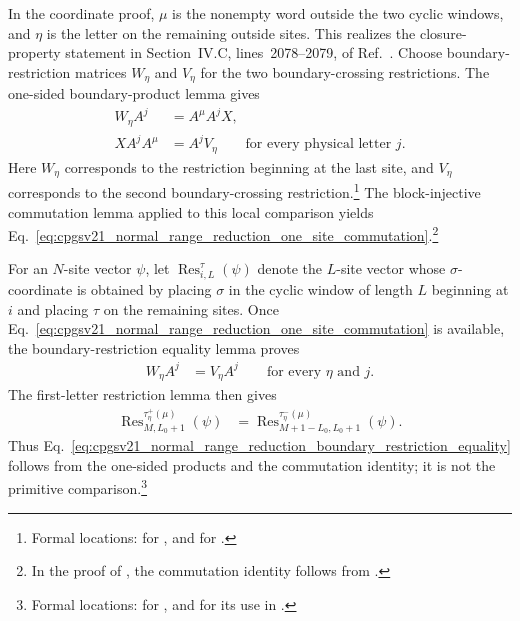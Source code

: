 \documentclass{article}
\begin{document}
In the coordinate proof, $\mu$ is the nonempty word outside the two cyclic
windows, and $\eta$ is the letter on the remaining outside sites. This realizes
the closure-property statement in Section~IV.C, lines~2078--2079, of
Ref.~\cite{Cirac2021Matrix}. Choose boundary-restriction matrices $W_\eta$ and
$V_\eta$ for the two boundary-crossing restrictions. The one-sided
boundary-product lemma gives
\begin{align}
    W_\eta A^j
        &= A^\mu A^jX,
    \label{eq:cpgsv21_normal_range_reduction_left_boundary_product}\\
    XA^jA^\mu
        &= A^jV_\eta
        \qquad\text{for every physical letter $j$}.
    \label{eq:cpgsv21_normal_range_reduction_right_boundary_product}
\end{align}
Here $W_\eta$ corresponds to the restriction beginning at the last site, and
$V_\eta$ corresponds to the second boundary-crossing restriction.\footnote{
Formal locations:
 for
,
and
 for
.}
The block-injective commutation lemma applied to this local comparison yields
Eq.~\ref{eq:cpgsv21_normal_range_reduction_one_site_commutation}.\footnote{In
the proof of
,
the commutation identity follows from
.}

For an $N$-site vector $\psi$, let
$\operatorname{Res}^{\tau}_{i,L}(\psi)$ denote the $L$-site vector whose
$\sigma$-coordinate is obtained by placing $\sigma$ in the cyclic window of
length $L$ beginning at $i$ and placing $\tau$ on the remaining sites. Once
Eq.~\ref{eq:cpgsv21_normal_range_reduction_one_site_commutation} is available,
the boundary-restriction equality lemma proves
\begin{align}
    W_\eta A^j
        &= V_\eta A^j
        \qquad\text{for every $\eta$ and $j$}.
    \label{eq:cpgsv21_normal_range_reduction_boundary_first_letter_products}
\end{align}
The first-letter restriction lemma then gives
\begin{align}
    \operatorname{Res}^{\tau^+_\eta(\mu)}_{M,L_0+1}(\psi)
        &=
    \operatorname{Res}^{\tau^-_\eta(\mu)}_{M+1-L_0,L_0+1}(\psi).
    \label{eq:cpgsv21_normal_range_reduction_boundary_restriction_equality}
\end{align}
Thus Eq.~\ref{eq:cpgsv21_normal_range_reduction_boundary_restriction_equality}
follows from the one-sided products and the commutation identity; it is not
the primitive comparison.\footnote{Formal locations:
 for
, and
 for its use in
.}
\end{document}

